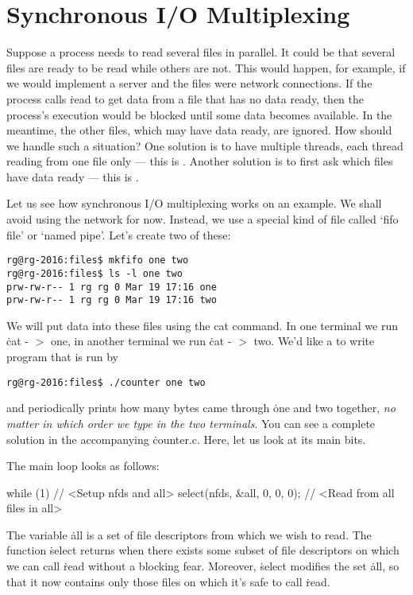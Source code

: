 \section{Synchronous I/O Multiplexing}

Suppose a process needs to read several files in parallel.
It could be that several files are ready to be read while others are not.
This would happen, for example,
  if we would implement a server and the files were network connections.
If the process calls \.{read} to get data from a file that has no data ready,
  then the process's execution would be blocked until some data becomes available.
In the meantime,
  the other files, which may have data ready, are ignored.
How should we handle such a situation?
One solution is to have multiple threads, each thread reading from one file only ---
  this is .
Another solution is to first ask which files have data ready ---
  this is .

Let us see how synchronous I/O multiplexing works on an example.
We shall avoid using the network for now.
Instead, we use a special kind of file called `fifo file' or `named pipe'.
Let's create two of these:
\begin{verbatim}
rg@rg-2016:files$ mkfifo one two
rg@rg-2016:files$ ls -l one two
prw-rw-r-- 1 rg rg 0 Mar 19 17:16 one
prw-rw-r-- 1 rg rg 0 Mar 19 17:16 two
\end{verbatim}
We will put data into these files using the cat command.
In one terminal we run \.{cat - $>$ one},
  in another terminal we run \.{cat - $>$ two}.
We'd like a to write program that is run by
\begin{verbatim}
rg@rg-2016:files$ ./counter one two
\end{verbatim}
and periodically prints how many bytes came through \.{one} and \.{two} together,
  \emph{no matter in which order we type in the two terminals}.
You can see a complete solution in the accompanying \.{counter.c}.
Here, let us look at its main bits.

The main loop looks as follows:
\begin{ccode}
while (1) {
  // <Setup nfds and all>
  select(nfds, &all, 0, 0, 0);
  // <Read from all files in all>
}
\end{ccode}
The variable \.{all} is a set of file descriptors from which we wish to read.
The function \.{select} returns when there exists some subset of file descriptors
  on which we can call \.{read} without a blocking fear.
Moreover, \.{select} modifies the set \.{all},
  so that it now contains only those files on which it's safe to call \.{read}.

